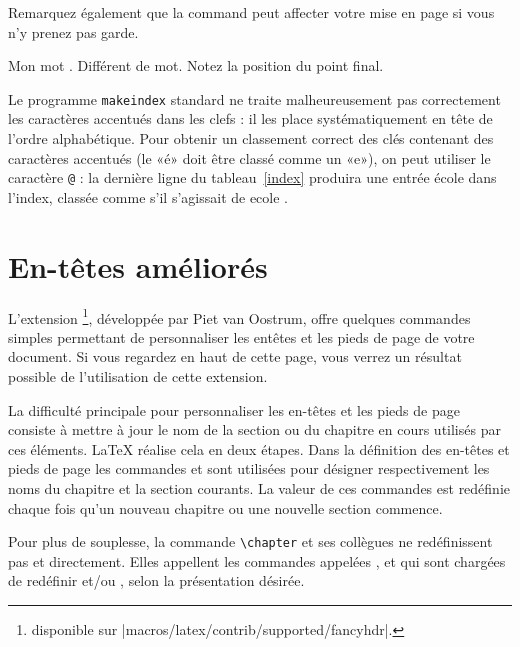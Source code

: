 Remarquez également que la command  peut affecter votre mise
en page si vous n'y prenez pas garde.

\begin{example}
Mon mot . Différent
de mot. Notez la
position du point final.
\end{example}

Le programme \texttt{makeindex} standard ne traite malheureusement pas
correctement les caractères accentués dans les clefs : il les place
systématiquement en tête de l'ordre alphabétique.
Pour obtenir un classement correct des clés contenant des caractères
accentués (le «é» doit être classé comme un «e»), on peut utiliser
le caractère \texttt{@} : la dernière ligne du tableau~\ref{index}
produira une entrée \og école \fg{} dans l'index, classée comme s'il s'agissait
de \og ecole \fg{}.


\section{En-têtes améliorés}
\label{sec:fancyhdr}

L'extension %
\footnote{disponible sur
          \CTAN|macros/latex/contrib/supported/fancyhdr|.},
développée par Piet van Oostrum, offre quelques commandes simples
permettant de personnaliser les entêtes et les pieds de page de votre
document. Si vous regardez en haut de cette page, vous verrez un
résultat possible de l'utilisation de cette extension.

La difficulté principale pour personnaliser les en-têtes et les pieds
de page consiste à mettre à jour le nom de la section ou du chapitre
en cours utilisés par ces éléments. \LaTeX{} réalise cela en deux
étapes. Dans la définition des en-têtes et pieds de page
les commandes  et  sont utilisées pour désigner
respectivement les noms du chapitre et la section courants.
La valeur de ces commandes est redéfinie chaque fois
qu'un nouveau chapitre ou une nouvelle section commence.

Pour plus de souplesse, la commande \verb|\chapter| et ses collègues
ne redéfinissent pas  et 
directement. Elles appellent les commandes appelées ,
 et  qui sont chargées de redéfinir
 et/ou , selon la présentation
désirée.

